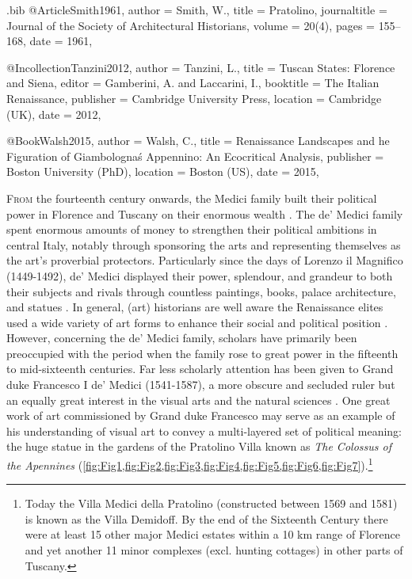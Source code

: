 \begin{filecontents}{\IJSRAidentifier.bib}
@Article{Smith1961,
  author       = {Smith, W.},
  title        = {Pratolino},
  journaltitle = {Journal of the Society of Architectural Historians},
  volume       = {20(4)},
  pages        = {155--168},
  date         = {1961},
}

@Incollection{Tanzini2012,
  author    = {Tanzini, L.},
  title     = {Tuscan States: Florence and Siena},
  editor    = {Gamberini, A. and Laccarini, I.},
  booktitle = {The Italian Renaissance},
  publisher = {Cambridge University Press},
  location  = {Cambridge (UK)},
  date      = {2012},
}

@Book{Walsh2015,
  author    = {Walsh, C.},
  title     = {Renaissance Landscapes and he Figuration of Giambolognaś Appennino: An Ecocritical Analysis},
  publisher = {Boston University (PhD)},
  location  = {Boston (US)},
  date      = {2015},
}
\end{filecontents}
\IJSRAopening%

\lettrine{F}{rom} the fourteenth century onwards, the Medici family built their political power in Florence and Tuscany on their enormous wealth \parencites[93,97]{Tanzini2012}. The de’ Medici family spent enormous amounts of money to strengthen their political ambitions in central Italy, notably through sponsoring the arts and representing themselves as the art’s proverbial protectors. Particularly since the days of Lorenzo il Magnifico (1449-1492), de’ Medici displayed their power, splendour, and grandeur to both their subjects and rivals through countless paintings, books, palace architecture, and statues \cites[685]{Hamburgh1996}[90-91]{Hibbert1979}. In general, (art) historians are well aware the Renaissance elites used a wide variety of art forms to enhance their social and political position \parencites[1]{DElia2011}. However, concerning the de’ Medici family, scholars have primarily been preoccupied with the period when the family rose to great power in the fifteenth to mid-sixteenth centuries. Far less scholarly attention has been given to Grand duke Francesco I de’ Medici (1541-1587), a more obscure and secluded ruler but an equally great interest in the visual arts and the natural sciences \parencites[1-3]{DElia2011}. One great work of art commissioned by Grand duke Francesco may serve as an example of his understanding of visual art to convey a
multi-layered set of political meaning: the huge statue in the gardens of the Pratolino Villa known as \textit{The Colossus of the Apennines} (\cref{fig:Fig1,fig:Fig2,fig:Fig3,fig:Fig4,fig:Fig5,fig:Fig6,fig:Fig7}).\footnote{Today the Villa Medici della Pratolino (constructed between 1569 and 1581) is known as the Villa Demidoff. By the end of the Sixteenth Century there were at least 15 other major Medici estates within a 10 km range of Florence and yet another 11 minor complexes (excl. hunting cottages) in other parts of Tuscany.}

